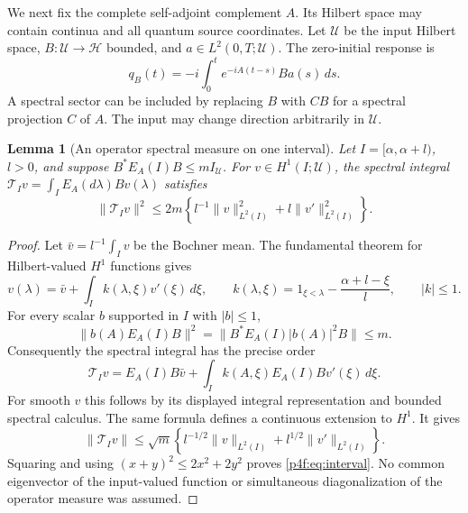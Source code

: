 \documentclass[11pt]{article}
\numberwithin{equation}{section}
\newtheorem{lemma}[theorem]{Lemma}
\theoremstyle{definition}
\theoremstyle{remark}
\begin{document}
We next fix the complete self-adjoint complement $A$.
Its Hilbert space may contain continua and all quantum
source coordinates. Let $\mathcal U$ be the input Hilbert
space, $B:\mathcal U\to\mathcal H$ bounded, and
$a\in L^2(0,T;\mathcal U)$. The zero-initial response is
\begin{equation}\label{p4f:eq:boundedresponse}
 q_B(t)=-i\int_0^t e^{-iA(t-s)}B a(s)\,ds .
\end{equation}
A spectral sector can be included by replacing $B$ with
$CB$ for a spectral projection $C$ of $A$.
The input may change direction arbitrarily in $\mathcal U$.

\begin{lemma}[An operator spectral measure on one interval]
\label{p4f:lem:interval}
Let $I=[\alpha,\alpha+l)$, $l>0$, and suppose
$B^*E_A(I)B\le mI_{\mathcal U}$. For
$v\in H^1(I;\mathcal U)$, the spectral integral
$\mathcal T_Iv=\int_I E_A(d\lambda)Bv(\lambda)$ satisfies
\begin{equation}\label{p4f:eq:interval}
 \|\mathcal T_Iv\|^2
 \le2m\left\{l^{-1}\|v\|_{L^2(I)}^2+
                         l\|v'\|_{L^2(I)}^2\right\}.
\end{equation}
\end{lemma}

\begin{proof}
Let $\bar v=l^{-1}\int_Iv$ be the Bochner mean.
The fundamental theorem for Hilbert-valued $H^1$ functions
gives
\[
 v(\lambda)=\bar v+\int_I k(\lambda,\xi)v'(\xi)\,d\xi,
 \qquad
 k(\lambda,\xi)=1_{\xi<\lambda}
                    -\frac{\alpha+l-\xi}{l},\qquad |k|\le1.
\]
For every scalar $b$ supported in $I$ with $|b|\le1$,
\[
 \|b(A)E_A(I)B\|^2
 =\|B^*E_A(I)|b(A)|^2B\|\le m.
\]
Consequently the spectral integral has the precise order
\[
 \mathcal T_Iv=E_A(I)B\bar v+
     \int_I k(A,\xi)E_A(I)Bv'(\xi)\,d\xi.
\]
For smooth $v$ this follows by its displayed integral
representation and bounded spectral calculus. The same
formula defines a continuous extension to $H^1$.
It gives
\[
 \|\mathcal T_Iv\|
 \le\sqrt m\left\{l^{-1/2}\|v\|_{L^2(I)}
                         +l^{1/2}\|v'\|_{L^2(I)}\right\}.
\]
Squaring and using $(x+y)^2\le2x^2+2y^2$ proves
\eqref{p4f:eq:interval}. No common eigenvector of the
input-valued function or simultaneous diagonalization
of the operator measure was assumed.
\end{proof}
\end{document}
